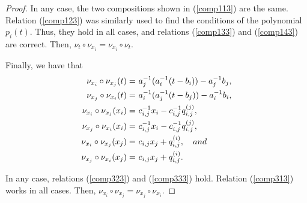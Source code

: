 \documentclass{amsart}
\theoremstyle{definition}
\theoremstyle{remark}
\numberwithin{equation}{section}
\begin{document}
\begin{proof}
In any case, the two compositions shown in {\rm (}\ref{comp113}{\rm )} are the same. Relation {\rm (}\ref{comp123}{\rm )} was similarly used to find the conditions of the polynomial $p_i(t)$. Thus, they hold in all cases, and relations {\rm (}\ref{comp133}{\rm )} and {\rm (}\ref{comp143}{\rm )} are correct. Then, $\nu_{t}\circ\nu_{x_i}=\nu_{x_i}\circ\nu_{t}$.

Finally, we have that 
\begin{align}
    \nu_{x_i} \circ \nu_{x_j}(t) = &\ a_j^{-1}(a_i^{-1}(t-b_i))-a_j^{-1}b_j, \label{comp313.} \\ 
    \nu_{x_j} \circ \nu_{x_i}(t) = &\ a_i^{-1}(a_j^{-1}(t-b_j))-a_i^{-1}b_i, \label{comp313} \\
    \nu_{x_i} \circ \nu_{x_j}(x_i) = &\ c_{i,j}^{-1}x_i-c_{i,j}^{-1}q_{i,j}^{(j)}, \label{comp323.} \\
    \nu_{x_j} \circ \nu_{x_i}(x_i) = &\ c_{i,j}^{-1}x_i-c_{i,j}^{-1}q_{i,j}^{(j)}, \label{comp323} \\
    \nu_{x_i} \circ \nu_{x_j}(x_j) = &\ c_{i,j}x_j+q_{i,j}^{(i)}, \quad {\rm and} \label{comp333.} \\
    \nu_{x_j} \circ \nu_{x_i}(x_j) = &\ c_{i,j}x_j+q_{i,j}^{(i)}. \label{comp333}
\end{align}

In any case, relations {\rm (}\ref{comp323}{\rm )} and {\rm (}\ref{comp333}{\rm )} hold. Relation {\rm (}\ref{comp313}{\rm )} works in all cases. Then, $\nu_{x_i}\circ\nu_{x_j}=\nu_{x_j}\circ\nu_{x_i}$.
\end{proof}
\end{document}
